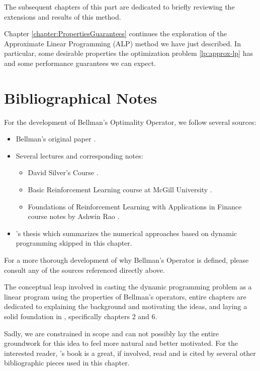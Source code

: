 The subsequent chapters of this part are dedicated to briefly reviewing the
extensions and results of this method.

Chapter \ref{chapter:PropertiesGuarantees} continues the exploration of the
Approximate Linear Programming (ALP) method we have just described. In
particular, some desirable properties the optimization problem
\eqref{lp:approx-lp} has and some performance guarantees we can expect.


\section{Bibliographical Notes}

For the development of Bellman's Optimality Operator, we follow several sources:
\begin{itemize}
    \item Bellman's original paper \cite{bellman1957}.
    \item Several lectures and corresponding notes:
    \begin{itemize}
        \item David Silver's Course \cite[Lects.~2-3]{silver2015}.
        \item Basic Reinforcement Learning course at McGill University
            \cite[Lect.~2]{moisescu-parejaa}.
        \item Foundations of Reinforcement Learning with Applications in Finance
            course notes by Ashwin Rao \cite[Lect. on Jan 15 2019]{raoRL4F}.
    \end{itemize}
    \item \citeauthor{nadeemward2021}'s thesis \cite{nadeemward2021} which
        summarizes the numerical approaches based on dynamic programming skipped
        in this chapter.
    \end{itemize}

For a more thorough development of why Bellman's Operator is defined, please
consult any of the sources referenced directly above.

The conceptual leap involved in casting the dynamic programming problem as a
linear program using the properties of Bellman's operators, entire chapters are
dedicated to explaining the background and motivating the ideas, and laying a
solid foundation in \cite{puterman2014}, specifically chapters 2 and 6.

Sadly, we are constrained in scope and can not possibly lay the entire
groundwork for this idea to feel more natural and better motivated. For the
interested reader, \citeauthor{puterman2014}'s book is a great, if involved,
read and is cited by several other bibliographic pieces used in this chapter.